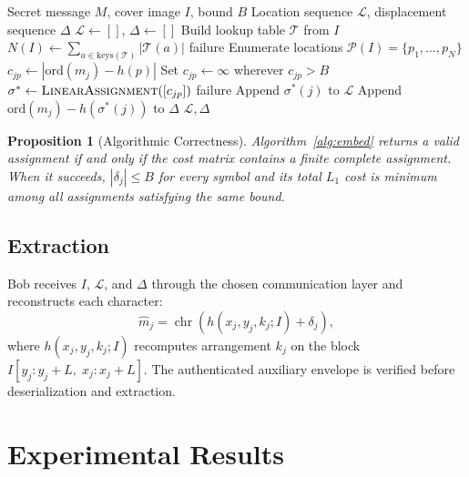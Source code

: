 \documentclass[preprint,12pt]{elsarticle}
\theoremstyle{plain}
\newtheorem{proposition}{Proposition}
\begin{document}
\begin{algorithm}[!t]
    \caption{FHAM Bounded Intra-Cover Assignment}
    \label{alg:embed}
    \begin{algorithmic}[1]
        \Require Secret message $M$, cover image $I$, bound $B$
        \Ensure Location sequence $\mathcal{L}$, displacement sequence $\Delta$
        \State $\mathcal{L} \gets []$, $\Delta \gets []$
        \State Build lookup table $\mathcal{T}$ from $I$
        \State $N(I) \gets \sum_{a \in \mathrm{keys}(\mathcal{T})} |\mathcal{T}(a)|$
            \State \Return failure
        \EndIf
        \State Enumerate locations $\mathcal{P}(I)=\{p_1,\ldots,p_N\}$
        \State $c_{jp}\gets|\text{ord}(m_j)-h(p)|$
        \State Set $c_{jp}\gets\infty$ wherever $c_{jp}>B$
        \State $\sigma^*\gets\textsc{LinearAssignment}([c_{jp}])$
            \State \Return failure
        \EndIf
            \State Append $\sigma^*(j)$ to $\mathcal{L}$
            \State Append $\text{ord}(m_j)-h(\sigma^*(j))$ to $\Delta$
        \EndFor
        \State \Return $\mathcal{L},\Delta$
    \end{algorithmic}
\end{algorithm}

\begin{proposition}[Algorithmic Correctness]
Algorithm~\ref{alg:embed} returns a valid assignment if and only if the cost
matrix contains a finite complete assignment. When it succeeds,
$|\delta_j|\leq B$ for every symbol and its total $L_1$ cost is minimum among
all assignments satisfying the same bound.
\end{proposition}

\subsection{Extraction}

Bob receives $I$, $\mathcal{L}$, and $\Delta$ through the chosen communication
layer and reconstructs each character:
\begin{equation}
    \hat{m}_j = \operatorname{chr}\!\left(
    h(x_j,y_j,k_j;I)+\delta_j\right),
\end{equation}
where $h(x_j,y_j,k_j;I)$ recomputes arrangement $k_j$ on the block
$I[y_j:y_j+L,\;x_j:x_j+L]$. The authenticated auxiliary envelope is verified
before deserialization and extraction.

\section{Experimental Results}
\label{sec:experiments}
\end{document}
